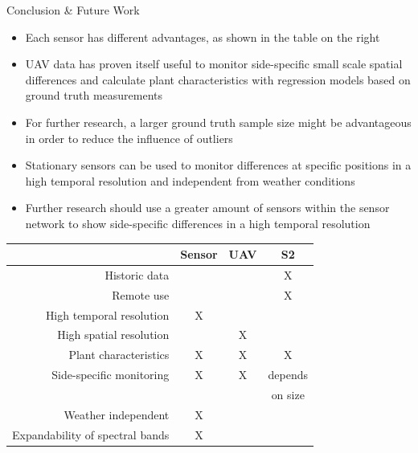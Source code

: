 \documentclass[final,hyperref={pdfpagelabels=false}]{beamer}
\begin{document}
\begin{frame}
\begin{block}{Conclusion \& Future Work}
\begin{minipage}{0.95\paperwidth}
\begin{minipage}{0.68\textwidth}
\small{
\begin{itemize}
    \item Each sensor has different advantages, as shown in the table on the right
    \item UAV data has proven itself useful to monitor side-specific small scale spatial differences and calculate plant characteristics with regression models based on ground truth measurements
    \item For further research, a larger ground truth sample size might be advantageous in order to reduce the influence of outliers
    \item Stationary sensors can be used to monitor differences at specific positions in a high temporal resolution and independent from weather conditions
    \item Further research should use a greater amount of sensors within the sensor network to show side-specific differences in a high temporal resolution
\end{itemize}
}
\end{minipage}
\hspace{5cm}
\begin{minipage}{0.22\textwidth}
\centering
\fontsize{22pt}{24pt}\selectfont
\begin{table}[]
    \centering
    \begin{tabular}{rccc}
    \toprule
         & Sensor & UAV & S2 \\
     \midrule
         Historic data & && X \\
         Remote use & & & X\\
         High temporal resolution & X & & \\
         High spatial resolution & & X & \\
         Plant characteristics & X & X & X\\
         Side-specific monitoring & X & X & depends  \\
         & & & on size\\
         Weather independent & X & & \\
         Expandability of spectral bands & X & &\\
     \bottomrule   
    \end{tabular}
    \label{tab:my_label}
\end{table}
\end{minipage}


\end{minipage}
\end{block}
\end{frame}
\end{document}
